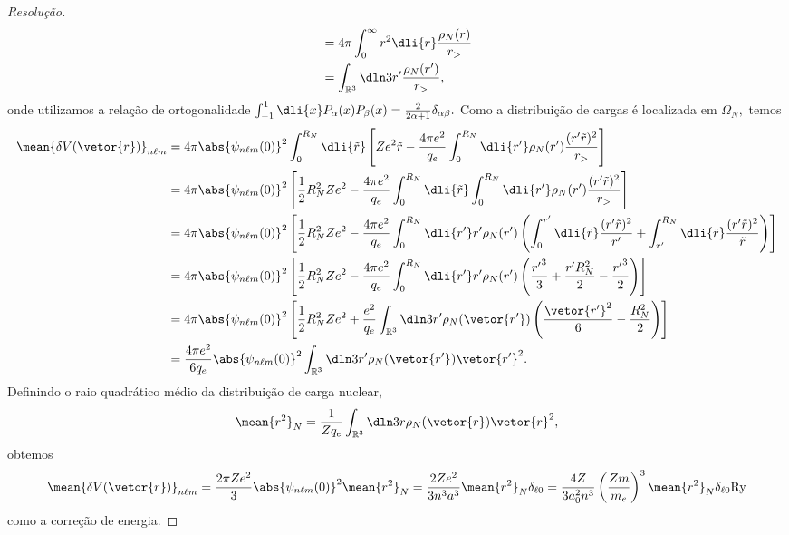 \begin{proof}[Resolução]
\begin{align*}
      &= 4\pi \int_0^\infty {r}^2 \dli{r} \frac{\rho_N(r)}{r_>}\\
      &= \int_{\mathbb{R}^3} \dln3{r'} \frac{\rho_N(r')}{r_>},
   \end{align*}
   onde utilizamos a relação de ortogonalidade \(\int_{-1}^1 \dli{x} P_\alpha(x) P_\beta(x) = \frac{2}{2\alpha+ 1} \delta_{\alpha \beta}.\) Como a distribuição de cargas é localizada em \(\Omega_N,\) temos
   \begin{align*}
      \mean{\delta V(\vetor{r})}_{n\ell m} &= 4\pi \abs{\psi_{n\ell m}(0)}^2 \int_0^{R_N}\dli{\tilde{r}}\left[Ze^2 \tilde{r} - \frac{4\pi e^2}{q_e} \int_0^{R_N}\dli{r'} \rho_N(r') \frac{(r' \tilde{r})^2}{r_>}\right]\\
                                           &= 4\pi \abs{\psi_{n\ell m}(0)}^2 \left[\frac12 R_N^2 Z e^2 - \frac{4\pi e^2}{q_e} \int_0^{R_N} \dli{\tilde{r}} \int_0^{R_N} \dli{r'} \rho_N(r') \frac{(r' \tilde{r})^2}{r_>}\right]\\
                                           &= 4\pi \abs{\psi_{n\ell m}(0)}^2 \left[\frac12 R_N^2 Z e^2 - \frac{4\pi e^2}{q_e} \int_0^{R_N} \dli{r'} r' \rho_N(r')\left(\int_0^{r'}\dli{\tilde{r}}\frac{(r' \tilde{r})^2}{r'} + \int_{r'}^{R_N} \dli{\tilde{r}}\frac{(r' \tilde{r})^2}{\tilde{r}}\right)\right]\\
                                           &= 4\pi \abs{\psi_{n\ell m}(0)}^2 \left[\frac12 R_N^2Ze^2 - \frac{4\pi e^2}{q_e}\int_0^{R_N}\dli{r'} r' \rho_N(r') \left(\frac{{r'}^3}{3} + \frac{r' R_N^2}{2} - \frac{{r'}^3}{2}\right)\right]\\
                                           &= 4\pi \abs{\psi_{n\ell m}(0)}^2 \left[\frac12 R_N^2 Z e^2 + \frac{e^2}{q_e} \int_{\mathbb{R}^3} \dln3{r'} \rho_N(\vetor{r'}) \left( \frac{\vetor{r'}^2}{6} - \frac{R_N^2}{2}\right)\right]\\
                                           &= \frac{4\pi e^2}{6 q_e}\abs{\psi_{n\ell m}(0)}^2  \int_{\mathbb{R}^3}\dln3{r'} \rho_N(\vetor{r'}) \vetor{r'}^2.
   \end{align*}
   Definindo o raio quadrático médio da distribuição de carga nuclear,
   \begin{equation*}
      \mean{r^2}_N = \frac{1}{Z q_e}\int_{\mathbb{R}^3} \dln3r \rho_N(\vetor{r}) \vetor{r}^2,
   \end{equation*}
   obtemos
   \begin{align*}
      \mean{\delta V(\vetor{r})}_{n\ell m} = \frac{2\pi Ze^2}{3}\abs{\psi_{n\ell m}(0)}^2 \mean{r^2}_N
                                           = \frac{2Z e^2}{3n^3 a^3} \mean{r^2}_N \delta_{\ell 0}
                                           = \frac{4Z}{3 a_0^2 n^3}\left(\frac{Z m}{m_e}\right)^3 \mean{r^2}_N \delta_{\ell 0} \mathrm{Ry}
   \end{align*}
   como a correção de energia.
\end{proof}
